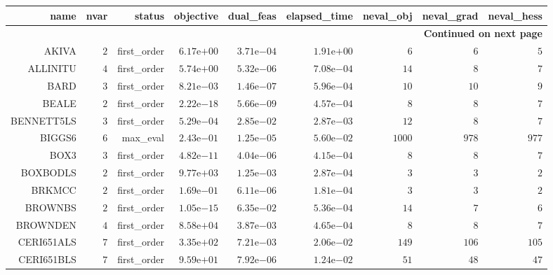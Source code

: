 \begin{longtable}{rrrrrrrrr}
\hline
name & nvar & status & objective & dual\_feas & elapsed\_time & neval\_obj & neval\_grad & neval\_hess \\\hline
\endhead
\hline
\multicolumn{9}{r}{{\bfseries Continued on next page}}\\
\hline
\endfoot
\endlastfoot
AKIVA & \(     2\) & first\_order & \( 6.17\)e\(+00\) & \( 3.71\)e\(-04\) & \( 1.91\)e\(+00\) & \(     6\) & \(     6\) & \(     5\) \\
ALLINITU & \(     4\) & first\_order & \( 5.74\)e\(+00\) & \( 5.32\)e\(-06\) & \( 7.08\)e\(-04\) & \(    14\) & \(     8\) & \(     7\) \\
BARD & \(     3\) & first\_order & \( 8.21\)e\(-03\) & \( 1.46\)e\(-07\) & \( 5.96\)e\(-04\) & \(    10\) & \(    10\) & \(     9\) \\
BEALE & \(     2\) & first\_order & \( 2.22\)e\(-18\) & \( 5.66\)e\(-09\) & \( 4.57\)e\(-04\) & \(     8\) & \(     8\) & \(     7\) \\
BENNETT5LS & \(     3\) & first\_order & \( 5.29\)e\(-04\) & \( 2.85\)e\(-02\) & \( 2.87\)e\(-03\) & \(    12\) & \(     8\) & \(     7\) \\
BIGGS6 & \(     6\) & max\_eval & \( 2.43\)e\(-01\) & \( 1.25\)e\(-05\) & \( 5.60\)e\(-02\) & \(  1000\) & \(   978\) & \(   977\) \\
BOX3 & \(     3\) & first\_order & \( 4.82\)e\(-11\) & \( 4.04\)e\(-06\) & \( 4.15\)e\(-04\) & \(     8\) & \(     8\) & \(     7\) \\
BOXBODLS & \(     2\) & first\_order & \( 9.77\)e\(+03\) & \( 1.25\)e\(-03\) & \( 2.87\)e\(-04\) & \(     3\) & \(     3\) & \(     2\) \\
BRKMCC & \(     2\) & first\_order & \( 1.69\)e\(-01\) & \( 6.11\)e\(-06\) & \( 1.81\)e\(-04\) & \(     3\) & \(     3\) & \(     2\) \\
BROWNBS & \(     2\) & first\_order & \( 1.05\)e\(-15\) & \( 6.35\)e\(-02\) & \( 5.36\)e\(-04\) & \(    14\) & \(     7\) & \(     6\) \\
BROWNDEN & \(     4\) & first\_order & \( 8.58\)e\(+04\) & \( 3.87\)e\(-03\) & \( 4.65\)e\(-04\) & \(     8\) & \(     8\) & \(     7\) \\
CERI651ALS & \(     7\) & first\_order & \( 3.35\)e\(+02\) & \( 7.21\)e\(-03\) & \( 2.06\)e\(-02\) & \(   149\) & \(   106\) & \(   105\) \\
CERI651BLS & \(     7\) & first\_order & \( 9.59\)e\(+01\) & \( 7.92\)e\(-06\) & \( 1.24\)e\(-02\) & \(    51\) & \(    48\) & \(    47\) \\

\end{longtable}
